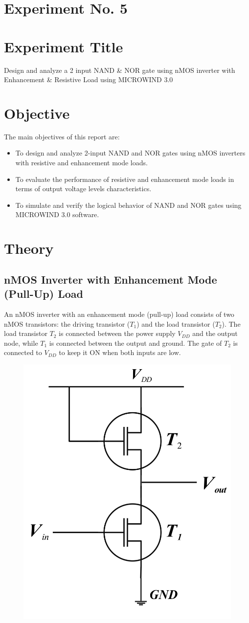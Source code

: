 \documentclass[a4paper,12pt]{article}
\begin{document}
	\section{Experiment No. 5}
	
	
	\section{Experiment Title }
Design and analyze a 2 input NAND \& NOR  gate using nMOS inverter 
with Enhancement \& Resistive Load using 	MICROWIND 3.0
	\section{Objective}
	The main objectives of this report are:
	
	\begin{itemize}
		\item To design and analyze 2-input NAND and NOR gates using nMOS inverters with resistive and enhancement mode loads.
		\item To evaluate the performance of resistive and enhancement mode loads in terms of output voltage levels characteristics.
		\item To simulate and verify the logical behavior of NAND and NOR gates using MICROWIND 3.0 software.
	
	\end{itemize}
	\section{Theory}
	\subsection{nMOS Inverter with Enhancement Mode (Pull-Up) Load}


An nMOS inverter with an enhancement mode (pull-up) load consists of two nMOS transistors: the driving transistor (\(T_1\)) and the load transistor (\(T_2\)). The load transistor \(T_2\) is connected between the power supply \(V_{DD}\) and the output node, while \(T_1\) is connected between the output and ground. The gate of \(T_2\) is connected to \(V_{DD}\) to keep it ON when both inputs are low.\\
\begin{figure}[H]
	\centering
	\includegraphics[width=0.45\linewidth]{../EXP04_EEE2214/Images/mos/1}
	\caption{}
	\label{fig:1}
\end{figure}
\end{document}
